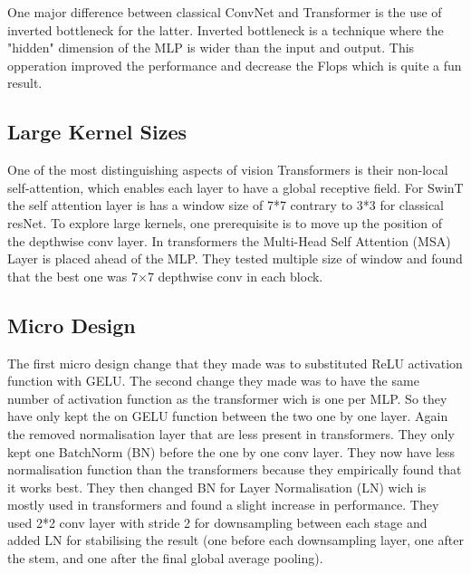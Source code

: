 One major difference between classical ConvNet and Transformer is the use of inverted bottleneck for the latter. Inverted bottleneck is a technique where the "hidden" dimension of the MLP is wider than the input and output. This opperation improved the performance and decrease the Flops which is quite a fun result.

\subsection*{Large Kernel Sizes}

One of the most distinguishing aspects of vision Transformers is their non-local self-attention, which enables each layer to have a global receptive field. For SwinT the self attention layer is has a window size of 7*7 contrary to 3*3 for classical resNet. To explore large kernels, one prerequisite is to move up the position of the depthwise conv layer. In transformers the Multi-Head Self Attention (MSA) Layer is placed ahead of the MLP. They tested multiple size of window and found that the best one was 7×7 depthwise conv in each block.

\subsection*{Micro Design}

The first micro design change that they made was to substituted ReLU activation function with GELU. The second change they made was to have the same number of activation function as the transformer wich is one per MLP. So they have only kept the on GELU function between the two one by  one layer. Again the removed normalisation layer that are less present in transformers. They only kept one BatchNorm (BN) before the one by one conv layer. They now have less normalisation function than the transformers because they empirically found that it works best. They then changed BN for Layer Normalisation (LN) wich is mostly used in transformers and found a slight increase in performance. They used 2*2 conv layer with stride 2 for downsampling between each stage and added LN for stabilising the result (one before each downsampling layer, one after the stem, and one after the final global average pooling).
